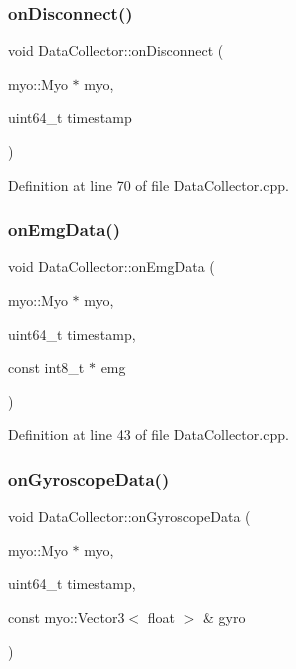 \subsubsection{\texorpdfstring{on\+Disconnect()}{onDisconnect()}}
{\footnotesize\ttfamily void Data\+Collector\+::on\+Disconnect (\begin{DoxyParamCaption}\item[{myo\+::\+Myo $\ast$}]{myo,  }\item[{uint64\+\_\+t}]{timestamp }\end{DoxyParamCaption})}



Definition at line 70 of file Data\+Collector.\+cpp.

\mbox{\label{class_data_collector_a43639de09ccb9c540a3d21d267e7460a}} 
\subsubsection{\texorpdfstring{on\+Emg\+Data()}{onEmgData()}}
{\footnotesize\ttfamily void Data\+Collector\+::on\+Emg\+Data (\begin{DoxyParamCaption}\item[{myo\+::\+Myo $\ast$}]{myo,  }\item[{uint64\+\_\+t}]{timestamp,  }\item[{const int8\+\_\+t $\ast$}]{emg }\end{DoxyParamCaption})}



Definition at line 43 of file Data\+Collector.\+cpp.

\mbox{\label{class_data_collector_a46ee5fda02554a8d84a0f449026dcfac}} 
\subsubsection{\texorpdfstring{on\+Gyroscope\+Data()}{onGyroscopeData()}}
{\footnotesize\ttfamily void Data\+Collector\+::on\+Gyroscope\+Data (\begin{DoxyParamCaption}\item[{myo\+::\+Myo $\ast$}]{myo,  }\item[{uint64\+\_\+t}]{timestamp,  }\item[{const myo\+::\+Vector3$<$ float $>$ \&}]{gyro }\end{DoxyParamCaption})}



